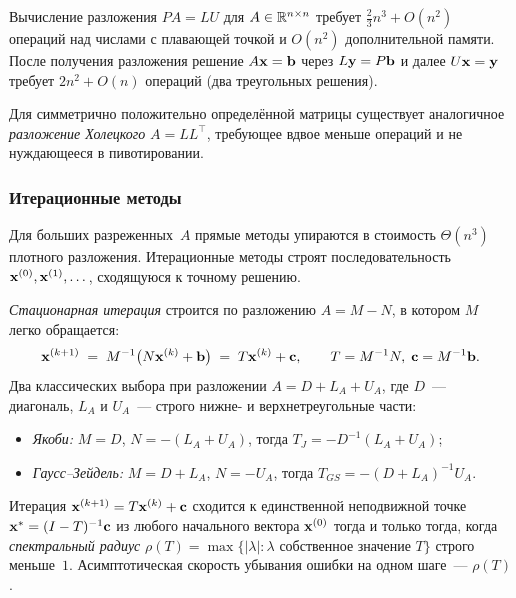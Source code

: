 \begin{theorem}
\label{thm:lu-cost}
Вычисление разложения $P A = L U$ для $A \in \mathbb{R}^{n \times n}$ требует
$\tfrac{2}{3} n^3 + O(n^2)$ операций над числами с плавающей точкой и
$O(n^2)$ дополнительной памяти. После получения разложения решение
$A \mathbf{x} = \mathbf{b}$ через $L \mathbf{y} = P \mathbf{b}$ и далее
$U \mathbf{x} = \mathbf{y}$ требует $2 n^2 + O(n)$ операций (два
треугольных решения).
\end{theorem}

Для симметрично положительно определённой матрицы существует
аналогичное \emph{разложение Холецкого} $A = L L^\top$, требующее вдвое
меньше операций и не нуждающееся в пивотировании.

\subsubsection*{Итерационные методы}

Для больших разреженных~$A$ прямые методы упираются в стоимость
$\Theta(n^3)$ плотного разложения. Итерационные методы строят
последовательность $\mathbf{x}^{(0)}, \mathbf{x}^{(1)}, \dots$, сходящуюся
к точному решению.

\emph{Стационарная итерация} строится по разложению $A = M - N$, в
котором $M$ легко обращается:
\[
  \mathbf{x}^{(k+1)} \;=\; M^{-1} \bigl(N \mathbf{x}^{(k)} + \mathbf{b}\bigr)
                      \;=\; T \mathbf{x}^{(k)} + \mathbf{c},
  \qquad T = M^{-1} N, \;\mathbf{c} = M^{-1} \mathbf{b}.
\]
Два классических выбора при разложении $A = D + L_A + U_A$, где
$D$~--- диагональ, $L_A$ и $U_A$~--- строго нижне- и
верхнетреугольные части:
\begin{itemize}
  \item \emph{Якоби:} $M = D$, $N = -(L_A + U_A)$, тогда
        $T_J = -D^{-1}(L_A + U_A)$;
  \item \emph{Гаусс--Зейдель:} $M = D + L_A$, $N = -U_A$, тогда
        $T_{GS} = -(D + L_A)^{-1} U_A$.
\end{itemize}

\begin{theorem}
\label{thm:stationary-convergence}
Итерация $\mathbf{x}^{(k+1)} = T \mathbf{x}^{(k)} + \mathbf{c}$ сходится к
единственной неподвижной точке
$\mathbf{x}^* = (I - T)^{-1} \mathbf{c}$ из любого начального вектора
$\mathbf{x}^{(0)}$ тогда и только тогда, когда \emph{спектральный
радиус} $\rho(T) = \max\{|\lambda| : \lambda \text{ собственное значение } T\}$
строго меньше~$1$. Асимптотическая скорость убывания ошибки на одном
шаге~--- $\rho(T)$.
\end{theorem}

